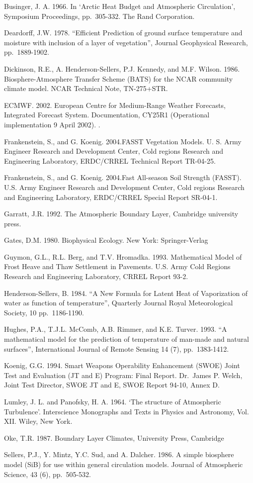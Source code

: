 Businger, J. A. 1966. In `Arctic Heat Budget and Atmospheric Circulation', Symposium Proceedings, pp.~305-332. The Rand Corporation.

Deardorff, J.W. 1978. ``Efficient Prediction of ground surface temperature and moisture with inclusion of a layer of vegetation'', Journal Geophysical Research, pp.~1889-1902.

Dickinson, R.E., A. Henderson-Sellers, P.J. Kennedy, and M.F. Wilson. 1986. Biosphere-Atmosphere Transfer Scheme (BATS) for the NCAR community climate model. NCAR Technical Note, TN-275+STR.

ECMWF. 2002. European Centre for Medium-Range Weather Forecasts, Integrated Forecast System. Documentation, CY25R1 (Operational implementation 9 April 2002). .

Frankenstein, S., and G. Koenig. 2004.FASST Vegetation Models. U. S. Army Engineer Research and Development Center, Cold regions Research and Engineering Laboratory, ERDC/CRREL Technical Report TR-04-25.

Frankenstein, S., and G. Koenig. 2004.Fast All-season Soil Strength (FASST). U.S. Army Engineer Research and Development Center, Cold regions Research and Engineering Laboratory, ERDC/CRREL Special Report SR-04-1.

Garratt, J.R. 1992. The Atmospheric Boundary Layer, Cambridge university press.

Gates, D.M. 1980. Biophysical Ecology. New York: Springer-Verlag

Guymon, G.L., R.L. Berg, and T.V. Hromadka. 1993. Mathematical Model of Frost Heave and Thaw Settlement in Pavements. U.S. Army Cold Regions Research and Engineering Laboratory, CRREL Report 93-2.

Henderson-Sellers, B. 1984. ``A New Formula for Latent Heat of Vaporization of water as function of temperature'', Quarterly Journal Royal Meteorological Society, 10 pp.~1186-1190.

Hughes, P.A., T.J.L. McComb, A.B. Rimmer, and K.E. Turver. 1993. ``A mathematical model for the prediction of temperature of man-made and natural surfaces'', International Journal of Remote Sensing 14 (7), pp.~1383-1412.

Koenig, G.G. 1994. Smart Weapons Operability Enhancement (SWOE) Joint Test and Evaluation (JT and E) Program: Final Report. Dr.~James P. Welch, Joint Test Director, SWOE JT and E, SWOE Report 94-10, Annex D.

Lumley, J. L. and Panofsky, H. A. 1964. `The structure of Atmospheric Turbulence'. Interscience Monographs and Texts in Physics and Astronomy, Vol. XII. Wiley, New York.

Oke, T.R. 1987. Boundary Layer Climates, University Press, Cambridge

Sellers, P.J., Y. Mintz, Y.C. Sud, and A. Dalcher. 1986. A simple biosphere model (SiB) for use within general circulation models. Journal of Atmospheric Science, 43 (6), pp.~505-532.
